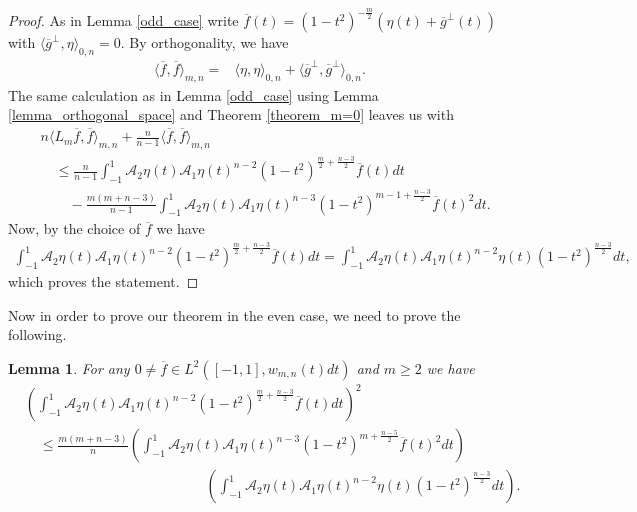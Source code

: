 \documentclass[12pt,twoside]{amsart}
\numberwithin{satz}{section}
\newtheorem{lemma}[satz]{Lemma}
\theoremstyle{definition}
\numberwithin{equation}{section}
\begin{document}
	\begin{proof}
		As in Lemma \ref{odd_case} write $\overline{f}(t)=(1-t^2)^{-\frac{m}{2}}\left(\eta(t)+\overline{g}^\perp(t)\right)$ with $\langle \overline{g}^\perp,\eta\rangle_{0,n}=0$. By orthogonality, we have
		\begin{align*}
			\langle \overline{f},\overline{f}\rangle_{m,n}=& \langle \eta,\eta\rangle_{0,n} + \langle \overline{g}^\perp,\overline{g}^\perp\rangle_{0,n}.
		\end{align*}
		The same calculation as in Lemma \ref{odd_case} using Lemma \ref{lemma_orthogonal_space} and Theorem \ref{theorem_m=0} leaves us with
		\begin{align*}
			& n\langle L_m\overline{f},\overline{f}\rangle_{m,n} + \frac{n}{n-1}\langle \overline{f},\overline{f}\rangle_{m,n} \\ 
			& \quad \leq \frac{n}{n-1}\int_{-1}^1 \mathcal{A}_2\eta(t)\mathcal{A}_1\eta(t)^{n-2}(1-t^2)^{\frac{m}{2}+\frac{n-3}{2}} \overline{f}(t)dt \\
			& \quad \quad  -\frac{m(m+n-3)}{n-1}\int_{-1}^1 \mathcal{A}_2\eta(t)\mathcal{A}_1\eta(t)^{n-3}(1-t^2)^{m-1+\frac{n-3}{2}}\overline{f}(t)^2dt.
		\end{align*}
		Now, by the choice of $\overline{f}$ we have
		\begin{align*}
			\int_{-1}^1 \mathcal{A}_2\eta(t)\mathcal{A}_1\eta(t)^{n-2}(1-t^2)^{\frac{m}{2}+\frac{n-3}{2}} \overline{f}(t)dt = \int_{-1}^1 \mathcal{A}_2\eta(t)\mathcal{A}_1\eta(t)^{n-2}\eta(t)(1-t^2)^{\frac{n-3}{2}}dt,
		\end{align*}
		which proves the statement.
	\end{proof}
	
	Now in order to prove our theorem in the even case, we need to prove the following.
	
	\begin{lemma}\label{lemma_CS_even}
		For any $0\neq\overline{f}\in L^2([-1,1],w_{m,n}(t)dt)$ and $m\geq 2$ we have
		\begin{align*}
			&\left(\int_{-1}^1 \mathcal{A}_2\eta(t)\mathcal{A}_1\eta(t)^{n-2}(1-t^2)^{\frac{m}{2}+\frac{n-3}{2}} \overline{f}(t)dt\right)^2  \\
			& \quad \leq \frac{m(m+n-3)}{n}\left(\int_{-1}^1 \mathcal{A}_2\eta(t)\mathcal{A}_1\eta(t)^{n-3}(1-t^2)^{m+\frac{n-5}{2}} \overline{f}(t)^2dt\right)\\
			& \quad \hspace{5cm}  \left(\int_{-1}^1 \mathcal{A}_2\eta(t)\mathcal{A}_1\eta(t)^{n-2}\eta(t)(1-t^2)^{\frac{n-3}{2}}dt\right).
		\end{align*}
	\end{lemma}
	
\end{document}

